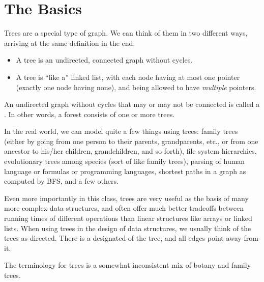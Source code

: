 \section{The Basics}
Trees are a special type of graph. We can think of them in two
different ways, arriving at the same definition in the end.

\begin{itemize}
\item A tree is an undirected, connected graph without cycles.
\item A tree is ``like a'' linked list, with each node having at most
  one  pointer (exactly one node having none), and being
  allowed to have \emph{multiple}  pointers.
\end{itemize}

An undirected graph without cycles that may or may not be connected is
called a . In other words, a forest consists of one or
more trees.

In the real world, we can model quite a few things using trees:
family trees (either by going from one person to their parents,
grandparents, etc., or from one ancestor to his/her children,
grandchildren, and so forth), file system hierarchies, evolutionary
trees among species (sort of like family trees), parsing of human
language or formulas or programming languages, shortest paths in a
graph as computed by BFS, and a few others.

Even more importantly in this class, trees are very useful as the
basis of many more complex data structures, and often offer much
better tradeoffs between running times of different operations than
linear structures like arrays or linked lists. 
When using trees in the design of data structures, we usually think of
the trees as directed. There is a designated  of the
tree, and all edges point away from it.

The terminology for trees is a somewhat inconsistent mix of botany and
family trees.

